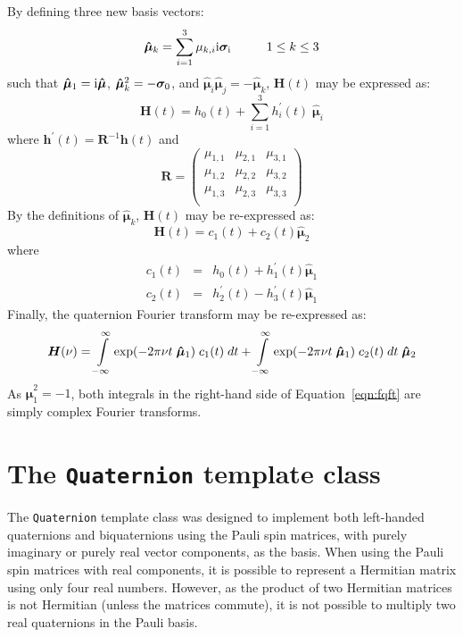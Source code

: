 \documentclass[12pt]{article}
\newcommand{\Ci}{{\rm i}}
\newcommand{\code}[1]{{\tt{#1}}}
\newcommand{\pauli}[1]{\ensuremath{ {\bm\sigma}_{\rm #1} }}
\begin{document}
\noindent
By defining three new basis vectors:
\begin{equation}
\bm{\hat\mu}_k = \sum_{i=1}^3 \mu_{k,i}\Ci\pauli{i} \hspace{1cm} 1\le k \le 3
\end{equation}
such that $\bm{\hat\mu}_1=\Ci\bm{\hat\mu}$,
$\bm{\hat\mu}_k^2=-\pauli{0}$, and
$\bm{\hat\mu}_i\bm{\hat\mu}_j=-\bm{\hat\mu}_k$, $\bm{H}(t)$ may be
expressed as:
\begin{equation}
\bm{H}(t) = h_0(t) + \sum_{i=1}^3 h_i^\prime(t)\;\bm{\hat\mu}_i
\end{equation}
where $\bm{h}^\prime(t)=\bm{R}^{-1}\bm{h}(t)$ and
\begin{equation}
\bm{R} = \left( \begin{array}{ccc}
\mu_{1,1} & \mu_{2,1} & \mu_{3,1} \\
\mu_{1,2} & \mu_{2,2} & \mu_{3,2} \\
\mu_{1,3} & \mu_{2,3} & \mu_{3,3} \\
\end{array}\right)
\end{equation}
By the definitions of $\bm{\hat\mu}_k$, $\bm{H}(t)$ may be re-expressed as:
\begin{equation}
\bm{H}(t) = c_1(t) + c_2(t)\bm{\hat\mu}_2
\end{equation}
where
\begin{eqnarray}
c_1(t) & = & h_0(t)+h_1^\prime(t)\bm{\hat\mu}_1 \\
c_2(t) & = & h_2^\prime(t)-h_3^\prime(t)\bm{\hat\mu}_1
\end{eqnarray}
Finally, the quaternion Fourier transform may be re-expressed as:
\begin{equation}\label{eqn:fqft}
\bm{H}(\nu)=\intop_{-\infty}^\infty
		\exp(-2\pi\nu t\;\bm{\hat\mu}_1)\;c_1(t)\;dt
	+ \intop_{-\infty}^\infty
		\exp(-2\pi\nu t\;\bm{\hat\mu}_1)\;c_2(t)\;dt\;\bm{\hat\mu}_2
\end{equation}
As $\bm{\hat\mu}_1^2=-1$, both integrals in the right-hand side of
Equation~\ref{eqn:fqft} are simply complex Fourier transforms.

\newpage
\section{The \code{Quaternion} template class}

The \code{Quaternion} template class was designed to implement both
left-handed quaternions and biquaternions using the Pauli spin
matrices, with purely imaginary or purely real vector components, as
the basis.  When using the Pauli spin matrices with real components,
it is possible to represent a Hermitian matrix using only four real
numbers.  However, as the product of two Hermitian matrices is not
Hermitian (unless the matrices commute), it is not possible to
multiply two real quaternions in the Pauli basis.
\end{document}
